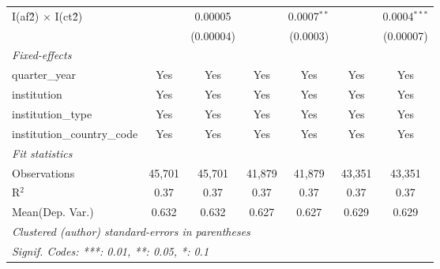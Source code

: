 \begin{tabular}{lcccccc}
   I(af\^2) $\times$ I(ct\^2)         &               & 0.00005        &               & 0.0007$^{**}$  &               & 0.0004$^{***}$\\   
                                      &               & (0.00004)      &               & (0.0003)       &               & (0.00007)\\   
   \midrule
   \emph{Fixed-effects}\\
   quarter\_year                      & Yes           & Yes            & Yes           & Yes            & Yes           & Yes\\  
   institution                        & Yes           & Yes            & Yes           & Yes            & Yes           & Yes\\  
   institution\_type                  & Yes           & Yes            & Yes           & Yes            & Yes           & Yes\\  
   institution\_country\_code         & Yes           & Yes            & Yes           & Yes            & Yes           & Yes\\  
   \midrule
   \emph{Fit statistics}\\
   Observations                       & 45,701        & 45,701         & 41,879        & 41,879         & 43,351        & 43,351\\  
   R$^2$                              & 0.37          & 0.37           & 0.37          & 0.37           & 0.37          & 0.37\\  
Mean(Dep. Var.) & 0.632 & 0.632 & 0.627 & 0.627 & 0.629 & 0.629 \\
   \midrule \midrule
   \multicolumn{7}{l}{\emph{Clustered (author) standard-errors in parentheses}}\\
   \multicolumn{7}{l}{\emph{Signif. Codes: ***: 0.01, **: 0.05, *: 0.1}}\\
\end{tabular}
\par\endgroup
